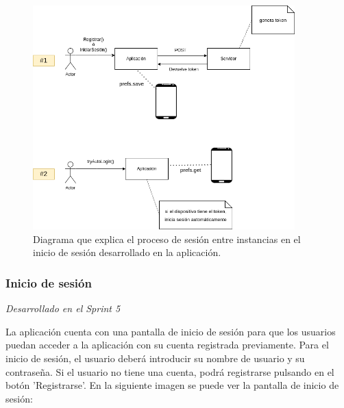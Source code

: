 \begin{itemize}
    \begin{figure}[H]
      \centering
      \includegraphics[width=0.9\textwidth]{imagenes/c7/token2.png}
      \caption{Diagrama que explica el proceso de sesión entre instancias en el inicio de sesión desarrollado en la aplicación.}
      \label{fig:sesion}

    \end{figure}

  \end{itemize}

\subsubsection{Inicio de sesión}
\textit{Desarrollado en el Sprint 5}
\label{sec:login}

La aplicación cuenta con una pantalla de inicio de sesión para que los usuarios puedan acceder a la aplicación con su cuenta registrada previamente. 
Para el inicio de sesión, el usuario deberá introducir su nombre de usuario y su contraseña. Si el usuario no tiene una cuenta, podrá registrarse pulsando en el botón 'Registrarse'. En la siguiente imagen se puede ver la pantalla de inicio de sesión:

